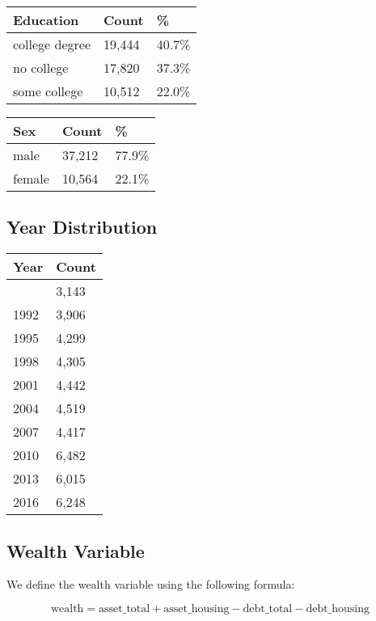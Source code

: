 \documentclass[
  letterpaper,
  DIV=11,
  numbers=noendperiod]{scrartcl}
\begin{document}
\begin{longtable}[]{@{}lll@{}}
\toprule\noalign{}
Education & Count & \% \\
\midrule\noalign{}
\endhead
\bottomrule\noalign{}
\endlastfoot
college degree & 19,444 & 40.7\% \\
no college & 17,820 & 37.3\% \\
some college & 10,512 & 22.0\% \\
\end{longtable}

\begin{longtable}[]{@{}lll@{}}
\toprule\noalign{}
Sex & Count & \% \\
\midrule\noalign{}
\endhead
\bottomrule\noalign{}
\endlastfoot
male & 37,212 & 77.9\% \\
female & 10,564 & 22.1\% \\
\end{longtable}

\subsection{Year Distribution}\label{year-distribution}

\begin{longtable}[]{@{}ll@{}}
\toprule\noalign{}
Year & Count \\
\midrule\noalign{}
\endhead
\bottomrule\noalign{}
\endlastfoot
1989 & 3,143 \\
1992 & 3,906 \\
1995 & 4,299 \\
1998 & 4,305 \\
2001 & 4,442 \\
2004 & 4,519 \\
2007 & 4,417 \\
2010 & 6,482 \\
2013 & 6,015 \\
2016 & 6,248 \\
\end{longtable}

\subsection{Wealth Variable}\label{wealth-variable}

We define the wealth variable using the following formula:

\[
\text{wealth} = \text{asset\_total} + \text{asset\_housing} - \text{debt\_total} - \text{debt\_housing}
\]
\end{document}
